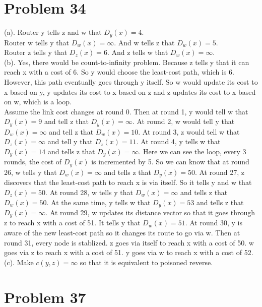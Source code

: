 \documentclass[titlepage, paper=a4, fontsize=11pt]{scrartcl} %
\numberwithin{equation}{section} %
\numberwithin{table}{section} %
\begin{document}

\section*{Problem 34}
(a).
Router y tells z and w that $D_y(x) = 4$. \\
Router w tells y that $D_w(x) = \infty$. And w tells z that $D_w(x) = 5$. \\
Router z tells y that $D_z(x) = 6$. And z tells w that $D_w(x) = \infty$. \\

(b).
Yes, there would be count-to-infinity problem. Because z tells y that it can reach x with a cost of 6. So y would choose the least-cost path, which is 6. However, this path eventually goes through y itself. So w would update its cost to x based on y, y updates its cost to x based on z and z updates its cost to x based on w, which is a loop. \\
Assume the link cost changes at round 0. Then at round 1, y would tell w that $D_y(x) = 9$ and tell z that $D_y(x)=\infty$. At round 2, w would tell y that $D_w(x) = \infty$ and tell z that $D_w(x) = 10$. At round 3, z would tell w that $D_z(x) = \infty$ and tell y that $D_z(x)=11$. At round 4, y tells w that $D_y(x)=14$ and tells z that $D_y(x)=\infty$. Here we can see the loop, every 3 rounds, the cost of $D_y(x)$ is incremented by 5. So we can know that at round 26, w tells y that $D_w(x) = \infty$ and tells z that $D_y(x)=50$. At round 27, z discovers that the least-cost path to reach x is via itself. So it tells y and w that $D_z(x) = 50$. At round 28, w tells y that $D_w(x)=\infty$ and tells z that $D_w(x)=50$. At the same time, y tells w that $D_y(x)=53$ and tells z that $D_y(x)=\infty$. At round 29, w updates its distance vector so that it goes through z to reach x with a cost of 51. It tells y that $D_w(x)=51$. At round 30, y is aware of the new least-cost path so it changes its route to go via w. Then at round 31, every node is stablized. z goes via itself to reach x with a cost of 50. w goes via z to reach x with a cost of 51. y goes via w to reach x with a cost of 52. \\

(c).
Make $c(y, z) = \infty$ so that it is equivalent to poisoned reverse. \\





\section*{Problem 37}
\end{document}
